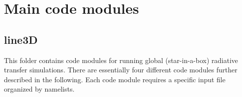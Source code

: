 \documentclass[10pt,a4paper]{article}
\begin{document}

\section{Main code modules}
\subsection{line3D}
\label{subsec:line3d}
This folder contains code modules for running global (star-in-a-box)
radiative transfer simulations. There are essentially four different
code modules further described in the following. Each code module
requires a specific input file organized by namelists.
\end{document}
